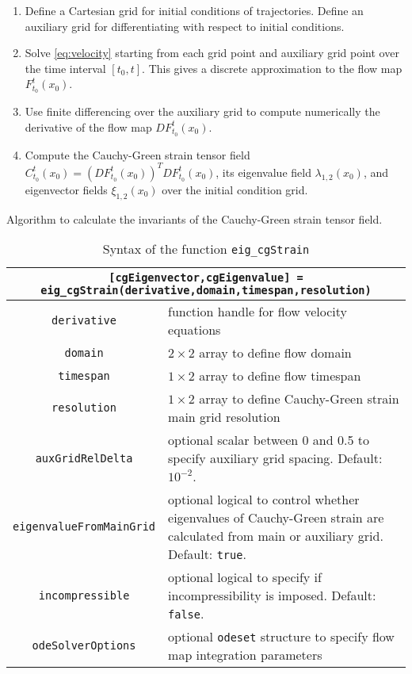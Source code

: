 \documentclass{article}
\begin{document}
\begin{table}
\begin{enumerate}
\item Define a Cartesian grid for initial conditions of trajectories. Define an auxiliary grid for differentiating with respect to initial conditions.
\item Solve \cref{eq:velocity} starting from each grid point and auxiliary grid point over the time interval $[t_0,t]$. This gives a discrete approximation to the flow map $F_{t_0}^t(x_0)$.
\item Use finite differencing over the auxiliary grid to compute numerically the derivative of the flow map $DF_{t_0}^t(x_0)$.
\item Compute the Cauchy-Green strain tensor field $C_{t_0}^t(x_0) = \left(DF_{t_0}^t(x_0)\right)^T DF_{t_0}^t(x_0)$, its eigenvalue field $\lambda_{1,2}(x_0)$, and eigenvector fields $\xi_{1,2}(x_0)$ over the initial condition grid.
\end{enumerate}
\caption{Algorithm to calculate the invariants of the Cauchy-Green strain tensor field.}
\label{t:Cauchy-Green algorithm}
\end{table}

\begin{table*}
\begin{center}
\begin{tabular}{|c|p{}|}
\hline
\multicolumn{2}{|p{.8\textwidth}|}{\lstinline![cgEigenvector,cgEigenvalue] = eig_cgStrain(derivative,domain,timespan,resolution)!}\tabularnewline
\hline \hline
\lstinline!derivative! & function handle for flow velocity equations\tabularnewline
\hline
\lstinline!domain! & $2 \times 2$ array to define flow domain\tabularnewline
\hline
\lstinline!timespan! & $1 \times 2$ array to define flow timespan\tabularnewline
\hline
\lstinline!resolution! & $1 \times 2$ array to define Cauchy-Green strain main grid resolution\tabularnewline
\hline
\lstinline!auxGridRelDelta! & optional scalar between 0 and 0.5 to specify auxiliary grid spacing. Default: $10^{-2}$.\tabularnewline
\hline
\lstinline!eigenvalueFromMainGrid! & optional logical to control whether eigenvalues of Cauchy-Green strain are calculated from main or auxiliary grid. Default: \lstinline!true!.\tabularnewline
\hline
\lstinline!incompressible! & optional logical to specify if incompressibility is imposed. Default: \lstinline!false!.\tabularnewline
\hline
\lstinline!odeSolverOptions! & optional \lstinline!odeset! structure to specify flow map integration parameters\tabularnewline
\hline
\end{tabular}
\caption{Syntax of the function \lstinline!eig_cgStrain!}
\label{t:eig_cgStrain syntax}
\end{center}
\end{table*}
\end{document}
